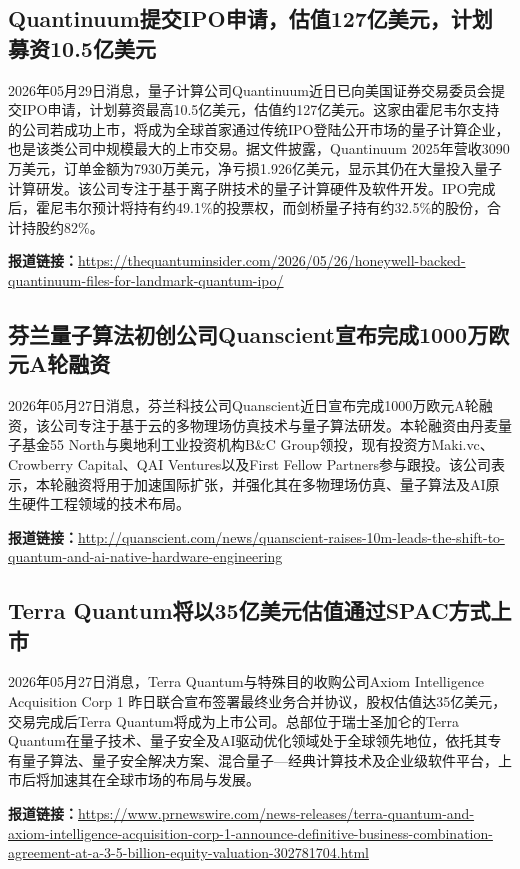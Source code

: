 \documentclass[12pt,a4paper]{ctexart}
\begin{document}
\subsection{ Quantinuum提交IPO申请，估值127亿美元，计划募资10.5亿美元 }

2026年05月29日消息，量子计算公司Quantinuum近日已向美国证券交易委员会提交IPO申请，计划募资最高10.5亿美元，估值约127亿美元。这家由霍尼韦尔支持的公司若成功上市，将成为全球首家通过传统IPO登陆公开市场的量子计算企业，也是该类公司中规模最大的上市交易。据文件披露，Quantinuum 2025年营收3090万美元，订单金额为7930万美元，净亏损1.926亿美元，显示其仍在大量投入量子计算研发。该公司专注于基于离子阱技术的量子计算硬件及软件开发。IPO完成后，霍尼韦尔预计将持有约49.1\%的投票权，而剑桥量子持有约32.5\%的股份，合计持股约82\%。

\noindent\textbf{报道链接：}\url{https://thequantuminsider.com/2026/05/26/honeywell-backed-quantinuum-files-for-landmark-quantum-ipo/ }

\subsection{ 芬兰量子算法初创公司Quanscient宣布完成1000万欧元A轮融资 }

2026年05月27日消息，芬兰科技公司Quanscient近日宣布完成1000万欧元A轮融资，该公司专注于基于云的多物理场仿真技术与量子算法研发。本轮融资由丹麦量子基金55 North与奥地利工业投资机构B\&C Group领投，现有投资方Maki.vc、Crowberry Capital、QAI Ventures以及First Fellow Partners参与跟投。该公司表示，本轮融资将用于加速国际扩张，并强化其在多物理场仿真、量子算法及AI原生硬件工程领域的技术布局。

\noindent\textbf{报道链接：}\url{http://quanscient.com/news/quanscient-raises-10m-leads-the-shift-to-quantum-and-ai-native-hardware-engineering }

\subsection{ Terra Quantum将以35亿美元估值通过SPAC方式上市 }

2026年05月27日消息，Terra Quantum与特殊目的收购公司Axiom Intelligence Acquisition Corp 1 昨日联合宣布签署最终业务合并协议，股权估值达35亿美元，交易完成后Terra Quantum将成为上市公司。总部位于瑞士圣加仑的Terra Quantum在量子技术、量子安全及AI驱动优化领域处于全球领先地位，依托其专有量子算法、量子安全解决方案、混合量子—经典计算技术及企业级软件平台，上市后将加速其在全球市场的布局与发展。

\noindent\textbf{报道链接：}\url{https://www.prnewswire.com/news-releases/terra-quantum-and-axiom-intelligence-acquisition-corp-1-announce-definitive-business-combination-agreement-at-a-3-5-billion-equity-valuation-302781704.html }
\end{document}
